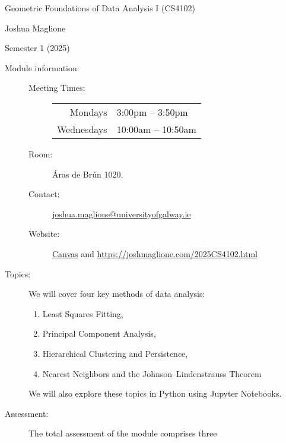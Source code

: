 \documentclass[a4paper, 12pt]{article}
\begin{document}
\pagestyle{empty}

\begin{center}
{\Large Geometric Foundations of Data Analysis I (CS4102)} 

\vspace{0.25cm}

{\large Joshua Maglione}

\vspace{0.25cm}

Semester 1 (2025)
\end{center}

\vspace{0.5cm}

\begin{description}
    \item[Module information:] \hfill
    \begin{description}
      \item[Meeting Times:] \hfill
      \begin{center}
        \begin{tabular}{rl}
          Mondays & 3:00pm -- 3:50pm \\ 
          Wednesdays & 10:00am -- 10:50am
        \end{tabular}
      \end{center}
      \item[Room:] \'Aras de Br\'un 1020,
      \item[Contact:] \url{joshua.maglione@universityofgalway.ie} 
      \item[Website:] \href{https://universityofgalway.instructure.com/}{\textsf{Canvas}} and \url{https://joshmaglione.com/2025CS4102.html} 
    \end{description} 
    \vspace{1cm}
    \item[Topics:] We will cover four key methods of data analysis:
    \begin{enumerate} 
      \item Least Squares Fitting,
      \item Principal Component Analysis,
      \item Hierarchical Clustering and Persistence,
      \item Nearest Neighbors and the Johnson--Lindenstrauss Theorem
    \end{enumerate}
    We will also explore these topics in Python using Jupyter Notebooks.
    \vspace{1cm}
    \item[Assessment:] The total assessment of the module comprises three

\end{description}
\end{document}
